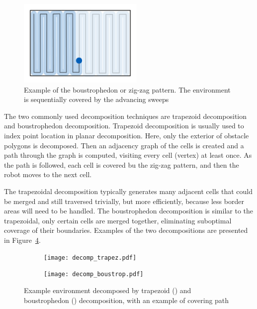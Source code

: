 \documentclass[buriama8_dp.tex]{subfiles}
\begin{document}
\begin{figure}[ht]
  \centering
  \includegraphics[width=6cm]{figures/zigzag.pdf}
  \caption[Boustrophedon pattern]{Example of the boustrophedon or zig-zag pattern. The environment is sequentially covered by the advancing sweeps}
  \label{fig:zig_pattern}
\end{figure}

The two commonly used decomposition techniques are trapezoid decomposition and boustrophedon decomposition. Trapezoid decomposition is usually used to index point location in planar decomposition. Here, only the exterior of obstacle polygons is decomposed. Then an adjacency graph of the cells is created and a path through the graph is computed, visiting every cell (vertex) at least once. As the path is followed, each cell is covered bu the zig-zag pattern, and then the robot moves to the next cell.

The trapezoidal decomposition typically generates many adjacent cells that could be merged and still traversed trivially, but more efficiently, because less border areas will need to be handled. The boustrophedon decomposition is similar to the trapezoidal, only certain cells are merged together, eliminating suboptimal coverage of their boundaries. Examples of the two decompositions are presented in Figure~\ref{fig:decomps}.

\begin{figure}[ht]
  \begin{subfigure}[t]{0.4\textwidth}
    \texttt{[image: decomp\_trapez.pdf]}
    \caption{}
    \label{fig:decomp_trapez}
  \end{subfigure}
  \begin{subfigure}[t]{0.4\textwidth}
    \texttt{[image: decomp\_boustrop.pdf]}
    \caption{}
    \label{fig:decomp_boustrop}
  \end{subfigure}

  \caption[Trapezoid and boustrophedon decompositions]{Example environment decomposed by trapezoid () and boustrophedon () decomposition, with an example of covering path}
  \label{fig:decomps}
\end{figure}
\end{document}

